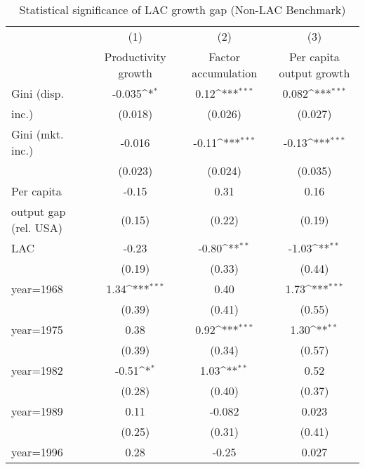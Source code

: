 \begin{sidewaystable}[htbp]\centering
\def\sym#1{\ifmmode^{#1}\else\(^{#1}\)\fi}
\caption{Statistical significance of LAC growth gap (Non-LAC Benchmark)}
\begin{tabular}{l*{3}{c}}
\toprule
                &\multicolumn{1}{c}{(1)}&\multicolumn{1}{c}{(2)}&\multicolumn{1}{c}{(3)}\\
                &\multicolumn{1}{c}{Productivity growth}&\multicolumn{1}{c}{Factor accumulation}&\multicolumn{1}{c}{Per capita output growth}\\
\midrule
Gini (disp.     &   -0.035\sym{*}  &     0.12\sym{***}&    0.082\sym{***}\\
inc.)           &  (0.018)         &  (0.026)         &  (0.027)         \\
\addlinespace
Gini (mkt. inc.)&   -0.016         &    -0.11\sym{***}&    -0.13\sym{***}\\
                &  (0.023)         &  (0.024)         &  (0.035)         \\
\addlinespace
Per capita      &    -0.15         &     0.31         &     0.16         \\
output gap (rel. USA)&   (0.15)         &   (0.22)         &   (0.19)         \\
\addlinespace
LAC             &    -0.23         &    -0.80\sym{**} &    -1.03\sym{**} \\
                &   (0.19)         &   (0.33)         &   (0.44)         \\
\addlinespace
year=1968       &     1.34\sym{***}&     0.40         &     1.73\sym{***}\\
                &   (0.39)         &   (0.41)         &   (0.55)         \\
\addlinespace
year=1975       &     0.38         &     0.92\sym{***}&     1.30\sym{**} \\
                &   (0.39)         &   (0.34)         &   (0.57)         \\
\addlinespace
year=1982       &    -0.51\sym{*}  &     1.03\sym{**} &     0.52         \\
                &   (0.28)         &   (0.40)         &   (0.37)         \\
\addlinespace
year=1989       &     0.11         &   -0.082         &    0.023         \\
                &   (0.25)         &   (0.31)         &   (0.41)         \\
\addlinespace
year=1996       &     0.28         &    -0.25         &    0.027         \\

\end{tabular}
\end{sidewaystable}
